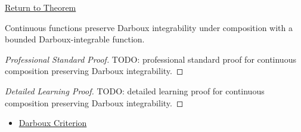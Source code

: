 \newpage
{}
\label{prf:darboux-integrable-continuous-composition}

\begin{remark*}[Return]
\hyperref[thm:darboux-integrable-continuous-composition]{Return to Theorem}
\end{remark*}

\begin{theorem*}
Continuous functions preserve Darboux integrability under composition with a
bounded Darboux-integrable function.
\end{theorem*}

\begin{proof}[Professional Standard Proof]
\LRAProofBodyStart
TODO: professional standard proof for continuous composition preserving Darboux integrability.
\end{proof}

\begin{proof}[Detailed Learning Proof]
\LRAProofBodyStart
TODO: detailed learning proof for continuous composition preserving Darboux integrability.
\end{proof}

\begin{remark*}
\end{remark*}

\begin{dependencies}
\begin{itemize}
  \item \hyperref[thm:darboux-criterion]{Darboux Criterion}
\end{itemize}
\end{dependencies}

\clearpage
